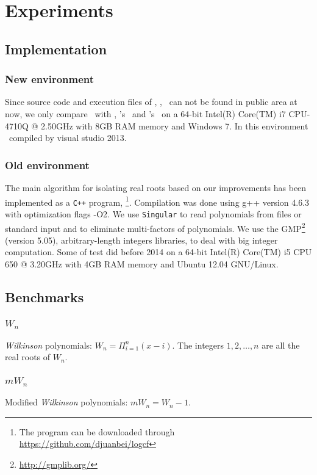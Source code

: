 
\section{Experiments }
\subsection{Implementation}
\subsubsection{New environment}

{\color{red}Since   source code and execution files  
	of    \eign, \cf,  \sle\  can not be found in public area at now, we only compare \froot\ with \AND, \MM's \inte\  and  \MAPLE's \REALROOT\  on   a 64-bit Intel(R) Core(TM) i7 CPU-4710Q @ 2.50GHz with 8GB RAM memory and Windows 7. In this environment \froot\ compiled by visual studio 2013}.

\subsubsection{Old environment}
The main algorithm for isolating real roots based on our improvements has been implemented as a \texttt{C++} program, \froot \footnote{The program can be downloaded through \url{https://github.com/djuanbei/logcf}}. Compilation was done using g++ version 4.6.3 with optimization flags -O2.
We use {\tt Singular} \cite{singular} to read polynomials from files or standard input and to eliminate multi-factors of polynomials. We use the GMP\footnote{ \url{http://gmplib.org/}}
(version 5.05), arbitrary-length integers libraries, to deal with big integer computation.
Some of test did before 2014   on a 64-bit Intel(R) Core(TM) i5 CPU 650 @ 3.20GHz with 4GB RAM memory and Ubuntu 12.04 GNU/Linux.



\subsection{Benchmarks }
 \subsubsection{$W_n$}
 {\it Wilkinson} polynomials: $W_n=\Pi_{i=1}^n(x-i)$. The integers $1,2,\ldots,n $ are  all the real roots of $W_n$.
  \subsubsection{$mW_n$}
  Modified {\it Wilkinson} polynomials: $mW_n=W_n-1$.

